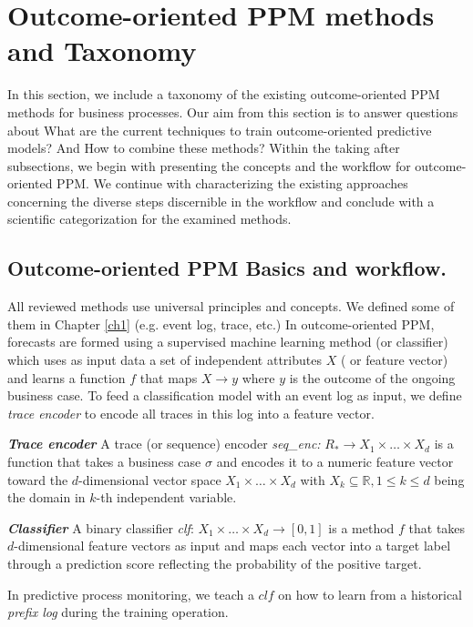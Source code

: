 
\ifpdf
    \graphicspath{{X/figures/PNG/}{X/figures/PDF/}{X/figures/}}
\else
    \graphicspath{{X/figures/EPS/}{X/figures/}}
\fi


 

\section{Outcome-oriented PPM methods and Taxonomy} \label{rq12}
In this section, we include a taxonomy of the existing outcome-oriented PPM methods for business processes. Our aim from this section is to answer questions about What are the current techniques to train outcome-oriented predictive models? And How to combine these methods? Within the taking after subsections, we begin with presenting the concepts and the workflow for outcome-oriented PPM. We continue with characterizing the existing approaches concerning the diverse steps discernible in the workflow and conclude with a scientific categorization for the examined methods.


\subsection{Outcome-oriented PPM Basics and workflow.} \label{wf}
All reviewed methods use universal principles and concepts. We defined some of them in Chapter \ref{ch1} (e.g. event log, trace, etc.)
In outcome-oriented PPM, forecasts are formed using a supervised machine learning method (or classifier) which uses as input data a set of independent attributes $X$ ( or feature vector) and learns a function $f$ that maps $X \to y$ where $y$ is the outcome of the ongoing business case. To feed a classification model with an event log as input, we define \textit{trace encoder} to encode all traces in this log into a feature vector.

\begin{definition}{\textit{\textbf{Trace encoder}}}
	A trace (or sequence) encoder \textit{seq\_enc:} $R_* \to X_1 \times \dots \times X_d$ is a function that takes a business case $\sigma$ and encodes it to a numeric feature vector toward the  $d$-dimensional vector space  $X_1 \times \dots \times X_d$ with $X_k \subseteq \mathbb{R}, 1 \le k \le d $ being the domain in $k$-th independent variable. 	
\end{definition} 

\begin{definition}{\textit{\textbf{Classifier}}}
		A binary classifier \textit{clf}: $X_1 \times \dots \times X_d \to [0, 1]$ is a method $f$ that takes $d$-dimensional feature vectors as input and maps each vector into a target label through a prediction score reflecting the probability of the positive target. 		
\end{definition} 
In predictive process monitoring, we teach a $clf$ on how to learn from a historical \textit{prefix log} during the training operation. 

